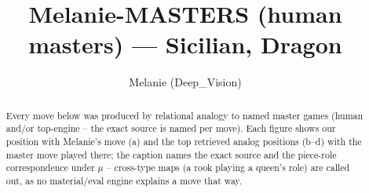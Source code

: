 \documentclass[11pt]{article}
\title{Melanie-MASTERS (human masters) — Sicilian, Dragon}
\author{Melanie (Deep\_Vision)}
\date{}
\begin{document}
\maketitle

\begin{abstract}Every move below was produced by relational analogy to named master games (human and/or top-engine -- the exact source is named per move). Each figure shows our position with Melanie's move (a) and the top retrieved analog positions (b--d) with the master move played there; the caption names the exact source and the piece-role correspondence under $\mu$ -- cross-type maps (a rook playing a queen's role) are called out, as no material/eval engine explains a move that way.\end{abstract}

\begin{figure}[p]\centering
\begin{subfigure}{0.46\textwidth}\centering
\resizebox{\linewidth}{!}{%
\newchessgame
\chessboard[
  setfen={rnbqk2r/pp2p1bp/3ppnp1/8/4P3/2N1B3/PPP2PPP/R2QKB1R w KQkq - 0 8},
  showmover=false,
  pgfstyle=straightmove, color=movearrow, markmove={d1-f3}
]}
\caption{}
\end{subfigure}\hfill
\begin{subfigure}{0.46\textwidth}\centering
\resizebox{\linewidth}{!}{%
\newchessgame
\chessboard[
  setfen={r1bqk2r/4bpp1/p1pppn1p/8/4P1P1/P1N1B3/1PP2P1P/R2QKBR1 w Qkq - 0 11},
  showmover=false,
  pgfstyle=straightmove, color=movearrow, markmove={d1-f3}
]}
\caption{}
\end{subfigure}
\\[4pt]
\begin{subfigure}{0.46\textwidth}\centering
\resizebox{\linewidth}{!}{%
\newchessgame
\chessboard[
  setfen={r2qk2r/pp2ppbp/2bp1np1/8/2N1P3/2N1B2P/PPP2PP1/R2Q1RK1 w kq - 0 14},
  showmover=false,
  pgfstyle=straightmove, color=movearrow, markmove={e4-e5}
]}
\caption{}
\end{subfigure}\hfill
\begin{subfigure}{0.46\textwidth}\centering
\resizebox{\linewidth}{!}{%
\newchessgame
\chessboard[
  setfen={r1bqkb1r/5pp1/p1pp1n1p/4p3/4P3/2N1B2P/PPP2PP1/R2QKB1R w KQkq - 0 14},
  showmover=false,
  pgfstyle=straightmove, color=movearrow, markmove={f1-c4}
]}
\caption{}
\end{subfigure}

\end{figure}
\end{document}
